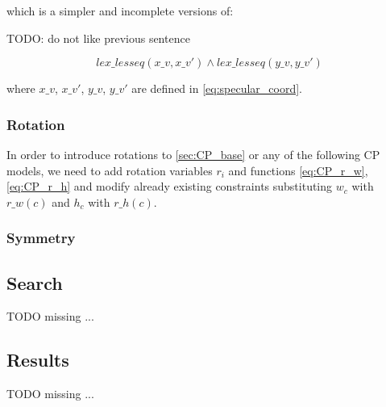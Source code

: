        which is a simpler and incomplete versions of:

        \colorbox{BurntOrange}{TODO: do not like previous sentence}

        \begin{equation*}
            lex\_lesseq(x\_v, x\_v') \land lex\_lesseq(y\_v, y\_v')
        \end{equation*} 

        where $x\_v$, $x\_v'$, $y\_v$, $y\_v'$ are defined in \ref{eq:specular_coord}.


    \subsubsection{Rotation}
        
        In order to introduce rotations to \ref{sec:CP_base} or any of the following CP models, we need 
        to add rotation variables $r_i$ and functions \ref{eq:CP_r_w}, \ref{eq:CP_r_h} and modify 
        already existing constraints substituting $w_c$ with $r\_w(c)$ and $h_c$ with $r\_h(c)$.

    \subsubsection{Symmetry}

        


\subsection{Search}
    \colorbox{BurntOrange}{TODO missing ...}


\subsection{Results}
    \colorbox{BurntOrange}{TODO missing ...}


